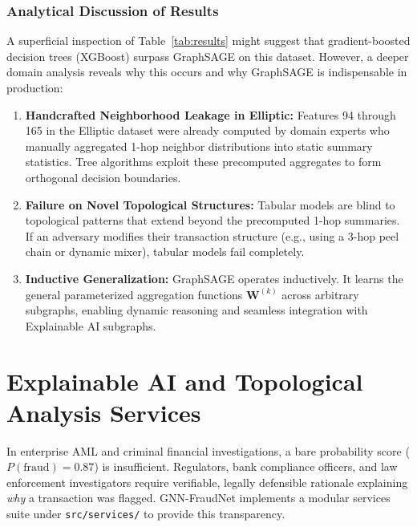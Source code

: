 \documentclass[11pt,a4paper]{report}
\begin{document}
\subsection{Analytical Discussion of Results}
A superficial inspection of Table~\ref{tab:results} might suggest that gradient-boosted decision trees (XGBoost) surpass GraphSAGE on this dataset. However, a deeper domain analysis reveals why this occurs and why GraphSAGE is indispensable in production:
\begin{enumerate}[leftmargin=1.5em]
  \item \textbf{Handcrafted Neighborhood Leakage in Elliptic:} Features 94 through 165 in the Elliptic dataset were already computed by domain experts who manually aggregated 1-hop neighbor distributions into static summary statistics. Tree algorithms exploit these precomputed aggregates to form orthogonal decision boundaries.
  \item \textbf{Failure on Novel Topological Structures:} Tabular models are blind to topological patterns that extend beyond the precomputed 1-hop summaries. If an adversary modifies their transaction structure (e.g., using a 3-hop peel chain or dynamic mixer), tabular models fail completely.
  \item \textbf{Inductive Generalization:} GraphSAGE operates inductively. It learns the general parameterized aggregation functions $\mathbf{W}^{(k)}$ across arbitrary subgraphs, enabling dynamic reasoning and seamless integration with Explainable AI subgraphs.

\end{enumerate}

\chapter{Explainable AI and Topological Analysis Services}

In enterprise AML and criminal financial investigations, a bare probability score ($P(\text{fraud}) = 0.87$) is insufficient. Regulators, bank compliance officers, and law enforcement investigators require verifiable, legally defensible rationale explaining \textit{why} a transaction was flagged. GNN-FraudNet implements a modular services suite under \texttt{src/services/} to provide this transparency.
\end{document}
